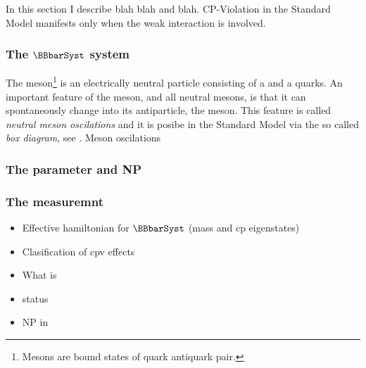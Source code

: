 

In this section I describe blah blah and blah.
CP-Violation in the Standard Model manifests only when the weak interaction is involved.

\subsubsection{The $\BBbarSyst$ system}
The \Bs meson\footnote{Mesons are bound states of quark antiquark pair.} is an electrically neutral
particle consisting of a \bquarkbar and a \squark quarks. An important feature of the \Bs meson,
and all neutral mesons, is that it can spontaneously change into its antiparticle, the \Bsb meson.
This feature is called {\it neutral meson oscilations} and it is posibe in the Standard Model via
the so called {\it box diagram}, see . Meson oscilations


\subsubsection{The \phis parameter and NP}

\subsubsection{The \phis measuremnt}




\begin{itemize}
  \item Effective hamiltonian for $\BBbarSyst$ (mass and cp eigenstates)
  \item Clasification of cpv effects
  \item What is \phis
  \item \phis status
  \item NP in \phis
\end{itemize}
